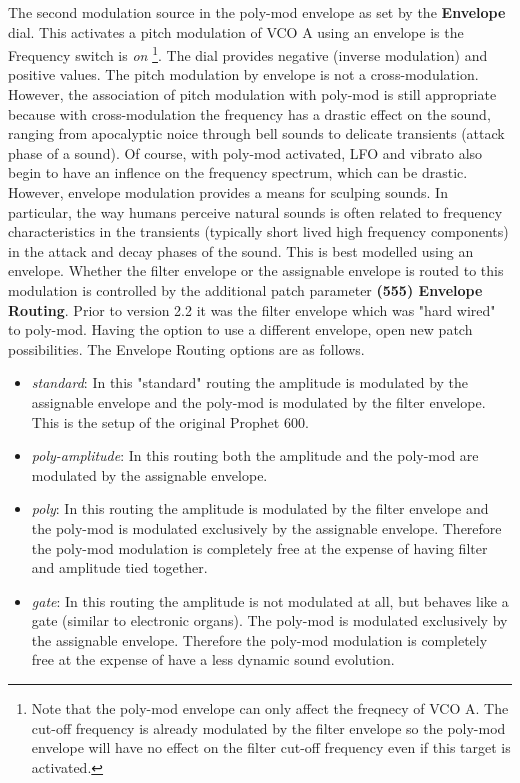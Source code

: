 The second modulation source in the poly-mod envelope as set by the \textbf{Envelope} dial. This activates a pitch modulation of VCO A using an envelope is the Frequency switch is \textit{on} \footnote{Note that the poly-mod envelope can only affect the freqnecy of VCO A. The cut-off frequency is already modulated by the filter envelope so the poly-mod envelope will have no effect on the filter cut-off frequency even if this target is activated.}. The dial provides negative (inverse modulation) and positive values. The pitch modulation by envelope is not a cross-modulation. However, the association of pitch modulation with poly-mod is still appropriate because with cross-modulation the frequency has a drastic effect on the sound, ranging from apocalyptic noice through bell sounds to delicate transients (attack phase of a sound). Of course, with poly-mod activated, LFO and vibrato also begin to have an inflence on the frequency spectrum, which can be drastic. However, envelope modulation provides a means for sculping sounds. In particular, the way humans perceive natural sounds is often related to frequency characteristics in the transients (typically short lived high frequency components) in the attack and decay phases of the sound. This is best modelled using an envelope. Whether the filter envelope or the assignable envelope is routed to this modulation is controlled by the additional patch parameter \textbf{(555) Envelope Routing}. Prior to version 2.2 it was the filter envelope which was "hard wired" to poly-mod. Having the option to use a different envelope, open new patch possibilities. The Envelope Routing options are as follows. 

\begin{itemize}
  \setlength\itemsep{0cm}
  \item \textit{standard}: In this "standard" routing the amplitude is modulated by the assignable envelope and the poly-mod is modulated by the filter envelope. This is the setup of the original Prophet 600. 
  \item \textit{poly-amplitude}: In this routing both the amplitude and the poly-mod are modulated by the assignable envelope. 
  \item \textit{poly}: In this routing the amplitude is modulated by the filter envelope and the poly-mod is modulated exclusively by the assignable envelope. Therefore the poly-mod modulation is completely free at the expense of having filter and amplitude tied together.
  \item \textit{gate}: In this routing the amplitude is not modulated at all, but behaves like a gate (similar to electronic organs). The poly-mod is modulated exclusively by the assignable envelope. Therefore the poly-mod modulation is completely free at the expense of have a less dynamic sound evolution.
\end{itemize}  

